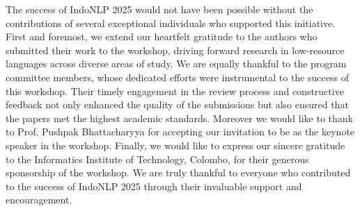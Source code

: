 \documentclass[11pt,a4paper]{article}
\begin{document}
The success of IndoNLP 2025 would not have been possible without the contributions of several exceptional individuals who supported this initiative. First and foremost, we extend our heartfelt gratitude to the authors who submitted their work to the workshop, driving forward research in low-resource languages across diverse areas of study. We are equally thankful to the program committee members, whose dedicated efforts were instrumental to the success of this workshop. Their timely engagement in the review process and constructive feedback not only enhanced the quality of the submissions but also ensured that the papers met the highest academic standards. Moreover we would like to thank to Prof. Pushpak Bhattacharyya for accepting our invitation to be as the keynote speaker in the workshop. Finally, we would like to express our sincere gratitude to the Informatics Institute of Technology, Colombo, for their generous sponsorship of the workshop. We are truly thankful to everyone who contributed to the success of IndoNLP 2025 through their invaluable support and encouragement.



\vspace*{0.5cm}
\end{document}
